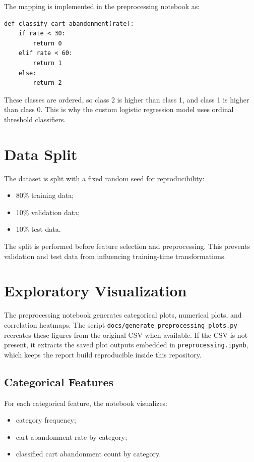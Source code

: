 \documentclass[11pt,a4paper]{article}
\begin{document}
The mapping is implemented in the preprocessing notebook as:
\begin{verbatim}
def classify_cart_abandonment(rate):
    if rate < 30:
        return 0
    elif rate < 60:
        return 1
    else:
        return 2
\end{verbatim}

These classes are ordered, so class 2 is higher than class 1, and class 1 is higher than class 0. This is why the custom logistic regression model uses ordinal threshold classifiers.

\section{Data Split}

The dataset is split with a fixed random seed for reproducibility:
\begin{itemize}
  \item 80\% training data;
  \item 10\% validation data;
  \item 10\% test data.
\end{itemize}

The split is performed before feature selection and preprocessing. This prevents validation and test data from influencing training-time transformations.

\section{Exploratory Visualization}

The preprocessing notebook generates categorical plots, numerical plots, and correlation heatmaps. The script \texttt{docs/generate\_preprocessing\_plots.py} recreates these figures from the original CSV when available. If the CSV is not present, it extracts the saved plot outputs embedded in \texttt{preprocessing.ipynb}, which keeps the report build reproducible inside this repository.

\subsection{Categorical Features}

For each categorical feature, the notebook visualizes:
\begin{itemize}
  \item category frequency;
  \item cart abandonment rate by category;
  \item classified cart abandonment count by category.
\end{itemize}
\end{document}
